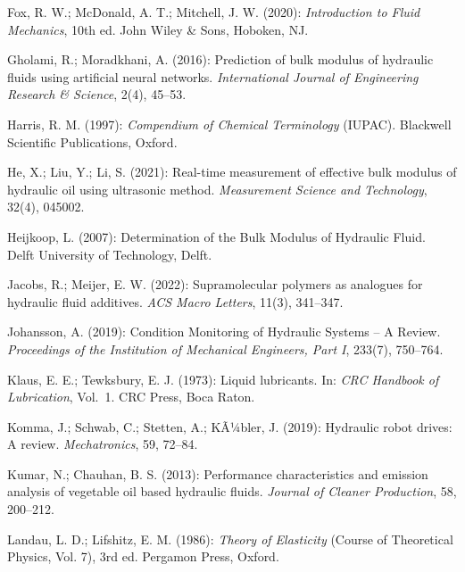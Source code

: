 ﻿\documentclass[a4paper,12pt]{scrreprt}
\theoremstyle{definition}
\begin{document}
\begin{enumerate}[label={[\arabic*]}]
  \item Fox, R. W.; McDonald, A. T.; Mitchell, J. W. (2020):
    \textit{Introduction to Fluid Mechanics}, 10th ed.
    John Wiley \& Sons, Hoboken, NJ.

  \item Gholami, R.; Moradkhani, A. (2016): Prediction of bulk
    modulus of hydraulic fluids using artificial neural networks.
    \textit{International Journal of Engineering Research \& Science},
    2(4), 45--53.

  \item Harris, R. M. (1997): \textit{Compendium of Chemical Terminology}
    (IUPAC). Blackwell Scientific Publications, Oxford.

  \item He, X.; Liu, Y.; Li, S. (2021): Real-time measurement of
    effective bulk modulus of hydraulic oil using ultrasonic method.
    \textit{Measurement Science and Technology}, 32(4), 045002.

  \item Heijkoop, L. (2007): Determination of the Bulk Modulus of
    Hydraulic Fluid. Delft University of Technology, Delft.

  \item Jacobs, R.; Meijer, E. W. (2022): Supramolecular polymers
    as analogues for hydraulic fluid additives.
    \textit{ACS Macro Letters}, 11(3), 341--347.

  \item Johansson, A. (2019): Condition Monitoring of Hydraulic
    Systems -- A Review. \textit{Proceedings of the Institution of
    Mechanical Engineers, Part I}, 233(7), 750--764.

  \item Klaus, E. E.; Tewksbury, E. J. (1973): Liquid lubricants.
    In: \textit{CRC Handbook of Lubrication}, Vol.~1. CRC Press,
    Boca Raton.

  \item Komma, J.; Schwab, C.; Stetten, A.; KÃ¼bler, J. (2019):
    Hydraulic robot drives: A review. \textit{Mechatronics}, 59,
    72--84.

  \item Kumar, N.; Chauhan, B. S. (2013): Performance characteristics
    and emission analysis of vegetable oil based hydraulic fluids.
    \textit{Journal of Cleaner Production}, 58, 200--212.

  \item Landau, L. D.; Lifshitz, E. M. (1986): \textit{Theory of
    Elasticity} (Course of Theoretical Physics, Vol. 7), 3rd ed.
    Pergamon Press, Oxford.


\end{enumerate}
\end{document}
